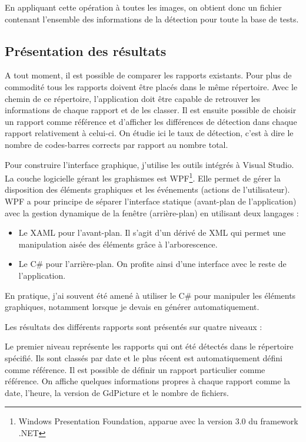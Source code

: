En appliquant cette opération à toutes les images, on obtient donc un fichier contenant l'ensemble des informations de la détection pour toute la base de tests.

\subsection{Présentation des résultats}

A tout moment, il est possible de comparer les rapports existants. Pour plus de commodité tous les rapports doivent être placés dans le même répertoire. Avec le chemin de ce répertoire, l'application doit être capable de retrouver les informations de chaque rapport et de les classer. Il est ensuite possible de choisir un rapport comme référence et d'afficher les différences de détection dans chaque rapport relativement à celui-ci. On étudie ici le taux de détection, c'est à dire le nombre de codes-barres corrects par rapport au nombre total.

Pour construire l'interface graphique, j'utilise les outils intégrés à Visual Studio. La couche logicielle gérant les graphismes est WPF\footnote{Windows Presentation Foundation, apparue avec la version 3.0 du framework .NET}. Elle permet de gérer la disposition des éléments graphiques et les événements (actions de l'utilisateur). WPF a pour principe de séparer l'interface statique (avant-plan de l'application) avec la gestion dynamique de la fenêtre (arrière-plan) en utilisant deux langages :
\begin{itemize}
\item Le XAML pour l'avant-plan. Il s'agit d'un dérivé de XML qui permet une manipulation aisée des éléments grâce à l'arborescence.
\item Le C\# pour l'arrière-plan. On profite ainsi d'une interface avec le reste de l'application.
\end{itemize}

En pratique, j'ai souvent été amené à utiliser le C\# pour manipuler les éléments graphiques, notamment lorsque je devais en générer automatiquement.

Les résultats des différents rapports sont présentés sur quatre niveaux :

\clearpage

Le premier niveau représente les rapports qui ont été détectés dans le répertoire spécifié. Ils sont classés par date et le plus récent est automatiquement défini comme référence. Il est possible de définir un rapport particulier comme référence. On affiche quelques informations propres à chaque rapport comme la date, l'heure, la version de GdPicture et le nombre de fichiers.

